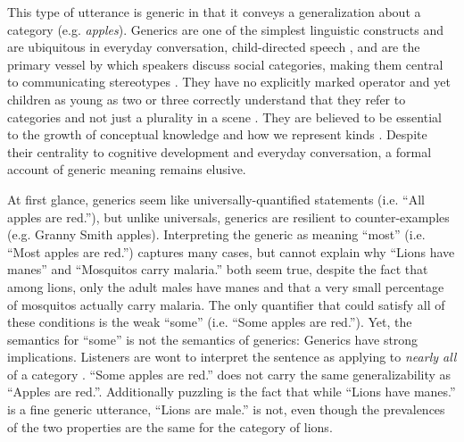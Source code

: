 \documentclass[10pt,letterpaper]{article}
\begin{document}
This type of utterance is generic \cite{Carlson1977, Leslie2008} in that it conveys a generalization about a category (e.g. \emph{apples}).  
Generics are one of the simplest linguistic constructs and are ubiquitous in everyday conversation, child-directed speech \cite{Gelman2008}, and are the primary vessel by which speakers discuss social categories, making them central to communicating stereotypes \cite{GelmanEtAl2004, Cimpian2010motivation, Leslie2015}.
They have no explicitly marked operator and yet children as young as two or three correctly understand that they refer to categories and not just a plurality in a scene \cite{Cimpian2008}. 
They are believed to be essential to the growth of conceptual knowledge \cite{Gelman2004} and how we represent kinds \cite{Leslie2008}.
Despite their centrality to cognitive development and everyday conversation, a formal account of generic meaning remains elusive.

At first glance, generics seem like universally-quantified statements (i.e. ``All apples are red.''), but unlike universals, generics are resilient to counter-examples (e.g. Granny Smith apples). 
Interpreting the generic as meaning ``most'' (i.e. ``Most apples are red.'') captures many cases, but cannot explain why ``Lions have manes'' and ``Mosquitos carry malaria.'' both seem true, despite the fact that among lions, only the adult males have manes and that a very small percentage of mosquitos actually carry malaria.
The only quantifier that could satisfy all of these conditions is the weak ``some'' (i.e. ``Some apples are red.'').  
Yet, the semantics for ``some'' is not the semantics of generics:  Generics have strong implications. 
Listeners are wont to interpret the sentence as applying to \emph{nearly all} of a category \cite{Gelman2002, Cimpian2010}. 
``Some apples are red.'' does not carry the same generalizability as ``Apples are red.''.
Additionally puzzling is the fact that while ``Lions have manes.'' is a fine generic utterance, ``Lions are male.'' is not, even though the prevalences of the two properties are the same for the category of lions.

\end{document}
